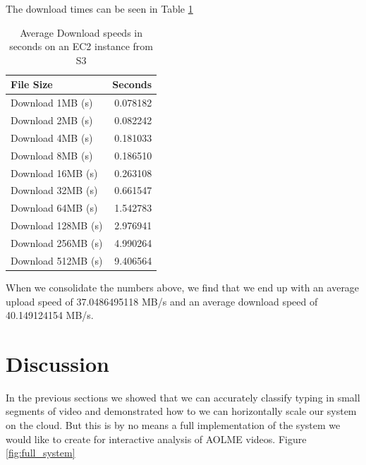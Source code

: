 The download times can be seen in Table \ref{tab:download_speed}
\begin{table}[h]
  \begin{tabular}{lr}
  \toprule
  {File Size} &         Seconds \\
  \midrule
  Download 1MB (s)   &  0.078182 \\
  Download 2MB (s)   &  0.082242 \\
  Download 4MB (s)   &  0.181033 \\
  Download 8MB (s)   &  0.186510 \\
  Download 16MB (s)  &  0.263108 \\
  Download 32MB (s)  &  0.661547 \\
  Download 64MB (s)  &  1.542783 \\
  Download 128MB (s) &  2.976941 \\
  Download 256MB (s) &  4.990264 \\
  Download 512MB (s) &  9.406564 \\
  \bottomrule
  \end{tabular}
\caption{Average Download speeds in seconds on an EC2 instance from S3}
\label{tab:download_speed}
\end{table}


When we consolidate the numbers above, we find that we end up with an average
upload speed of 37.0486495118 MB/s and an average download speed of 40.149124154 MB/s.

\FloatBarrier

\section{Discussion}
 In the previous sections we showed that we can accurately classify typing in
 small segments of video and demonstrated how to we can horizontally scale our
 system on the cloud. But this is by no means a full implementation of the system
 we would like to create for interactive analysis of AOLME videos. Figure
 \ref{fig:full_system}

